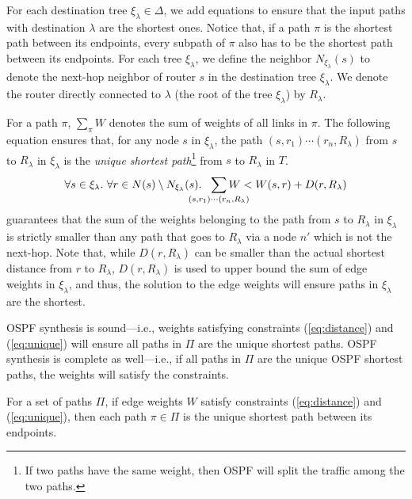 For each destination tree $\xi_\lambda\in\Delta$, we add equations to ensure 
that the input paths with destination $\lambda$ are the shortest ones.
Notice that, if a path $\pi$
is the shortest path between its endpoints, every 
subpath of $\pi$ also has to be the shortest path between its endpoints.
For each tree $\xi_\lambda$, we define the neighbor
 $N_{\xi_\lambda}(s)$ to denote the 
next-hop neighbor of router $s$ in the destination tree $\xi_\lambda$. 
We denote the router directly connected 
to $\lambda$ (the root of the tree $\xi_\lambda$) by $R_\lambda$.

For a path $\pi$, 
$\sum_{\pi} W$ denotes the sum of weights of all 
links in $\pi$. 
The following equation ensures that, for any node $s$ in 
$\xi_\lambda$, 
the path $(s,r_1)\cdots (r_n,R_\lambda)$ from $s$ to $R_\lambda$ 
in $\xi_\lambda$ is the 
\emph{unique shortest path}\footnote{
If two paths have the same weight, then OSPF will 
split the traffic among the two paths.
} from $s$ to $R_\lambda$ in $T$. 
\begin{equation} \label{eq:unique}
\forall s \in \xi_\lambda. ~
\forall r \in N(s) \setminus N_{\xi_\lambda}(s).~~
\sum_{\mathclap{\substack{(s,r_1)\cdots (r_n,R_\lambda)}}} 
W < W(s,r) + D(r, R_\lambda)
\end{equation}
 guarantees that 
the sum of the weights belonging to the path 
from $s$ to $R_\lambda$ in $\xi_\lambda$ 
is strictly smaller than 
any path that goes to $R_\lambda$ via 
a node $n'$ which is not the next-hop. Note that,
while $D(r, R_\lambda)$ can be smaller 
than the actual shortest
distance from $r$ to $R_\lambda$, 
$D(r, R_\lambda)$ is used to upper bound the sum of edge weights 
in $\xi_\lambda$, and  
thus, the solution to the edge weights will ensure 
paths in $\xi_\lambda$ are the shortest. 

OSPF synthesis is sound---i.e., weights satisfying
constraints (\ref{eq:distance}) and (\ref{eq:unique}) 
will ensure all paths in $\Pi$ are the unique shortest paths. 
OSPF synthesis is complete as well---i.e., if all 
paths in $\Pi$ are the unique OSPF shortest paths, 
the weights will satisfy the constraints. 

\iffull
\begin{theorem}
For a set of paths $\Pi$, if edge weights 
$W$ satisfy constraints (\ref{eq:distance}) and (\ref{eq:unique}), then 
each path $\pi \in \Pi$ is the unique shortest path between its endpoints. 
\end{theorem}

\fi


